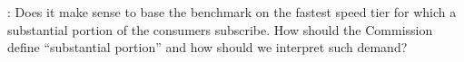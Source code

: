 %

: Does it make sense to base the benchmark on the fastest speed tier for which a substantial portion of the consumers subscribe. How should the Commission define ``substantial portion'' and how should we interpret such demand? 



